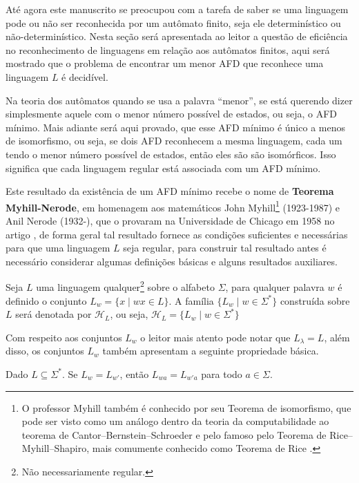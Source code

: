 Até agora este manuscrito se preocupou com a tarefa de saber se uma linguagem pode ou não ser reconhecida por um autômato finito,  seja ele determinístico ou não-determinístico. Nesta seção será apresentada ao leitor a questão de eficiência no reconhecimento de linguagens em relação aos autômatos finitos, aqui será mostrado que o problema de encontrar um menor AFD que reconhece uma linguagem $L$ é decidível. 

Na teoria dos autômatos quando se usa a palavra ``menor'', se está querendo dizer simplesmente aquele com o menor número possível de estados, ou seja, o AFD mínimo.  Mais adiante será aqui provado, que esse AFD mínimo é único a menos de isomorfismo, ou seja, se dois AFD reconhecem a mesma linguagem, cada um tendo o menor número possível de estados, então eles são são isomórficos. Isso significa que cada linguagem regular está associada com um AFD mínimo. 

Este resultado da existência de um AFD mínimo recebe o nome de \textbf{Teorema Myhill-Nerode}, em homenagem aos matemáticos John Myhill\footnote{O professor Myhill também é conhecido por seu Teorema de isomorfismo\cite{myhill1957-isomorfismo}, que pode ser visto como um análogo dentro da teoria da computabilidade ao teorema de Cantor–Bernstein–Schroeder e pelo famoso pelo Teorema  de Rice–Myhill–Shapiro, mais comumente conhecido como Teorema de Rice \cite{benjaLivro2010, rice1953-teorema-Rice}.} (1923-1987) e Anil Nerode (1932-), que o provaram na Universidade de Chicago em 1958 no artigo \cite{nerode1958}, de forma geral tal resultado fornece as condições suficientes e necessárias para que uma linguagem $L$ seja regular, para construir tal resultado antes é necessário considerar algumas definições básicas e alguns resultados auxiliares.

\begin{definition}\label{def:FamiliaH-L}
	Seja $L$ uma linguagem qualquer\footnote{Não necessariamente regular.} sobre o alfabeto $\Sigma$, para qualquer palavra $w$ é definido o conjunto $L_w = \{x \mid wx \in L\}$. A família $\{L_w \mid w \in \Sigma^*\}$ construída sobre $L$ será denotada por $\mathcal{H}_L$, ou seja, $\mathcal{H}_L = \{L_w \mid w \in \Sigma^*\}$
\end{definition}

Com respeito aos conjuntos $L_w$ o leitor mais atento pode notar que $L_\lambda = L$, além disso,  os conjuntos $L_w$ também apresentam a seguinte propriedade básica.

\begin{proposition}
	Dado $L \subseteq \Sigma^*$. Se $L_w = L_{w'}$, então $L_{wa} = L_{w'a}$ para todo $a \in \Sigma$.
\end{proposition}

